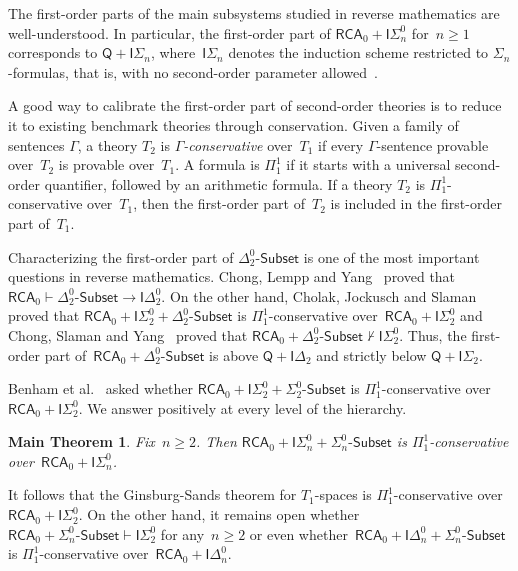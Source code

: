 \documentclass{article}
\newcommand{\ISig}{\mathsf{I}\Sigma^0}
\newcommand{\Robinson}{\mathsf{Q}}
\newcommand{\IDelta}{\mathsf{I}\Delta^0}
\newcommand{\Sub}[1]{{#1}\mbox{-}\mathsf{Subset}}
\newcommand{\RCA}{\mathsf{RCA}}
\numberwithin{theorem}{section}
\newtheorem{maintheorem}[theorem]{Main Theorem}
\theoremstyle{definition}
\begin{document}
The first-order parts of the main subsystems studied in reverse mathematics are well-understood.
In particular, the first-order part of $\RCA_0 + \ISig_n$ for~$n \geq 1$ corresponds to
$\Robinson + \mathsf{I}\Sigma_n$, where~$\mathsf{I}\Sigma_n$ denotes the induction scheme restricted to $\Sigma_n$-formulas, that is, with no second-order parameter allowed~\cite{friedmanSystemsSecondOrder1976}. 

A good way to calibrate the first-order part of second-order theories is to reduce it to existing benchmark theories through conservation. Given a family of sentences $\Gamma$, a theory $T_2$ is \emph{$\Gamma$-conservative} over~$T_1$ if every $\Gamma$-sentence provable over~$T_2$ is provable over~$T_1$. A formula is \emph{$\Pi^1_1$} if it starts with a universal second-order quantifier, followed by an arithmetic formula. If a theory $T_2$ is $\Pi^1_1$-conservative over~$T_1$, then the first-order part of~$T_2$ is included in the first-order part of~$T_1$.

Characterizing the first-order part of $\Sub{\Delta^0_2}$ is one of the most important questions in reverse mathematics. Chong, Lempp and Yang~\cite{chong2010role} proved that  $\RCA_0 \vdash \Sub{\Delta^0_2} \to \IDelta_2$. On the other hand, Cholak, Jockusch and Slaman~\cite{cholak2001strength} proved that $\RCA_0 + \ISig_2 + \Sub{\Delta^0_2}$ is $\Pi^1_1$-conservative over~$\RCA_0 + \ISig_2$ and Chong, Slaman and Yang~\cite{chong2017inductive} proved that $\RCA_0 + \Sub{\Delta^0_2} \nvdash \ISig_2$. Thus, the first-order part of~$\RCA_0 + \Sub{\Delta^0_2}$ is above $\Robinson + \mathsf{I}\Delta_2$ and strictly below $\Robinson + \mathsf{I}\Sigma_2$.

Benham et al.~\cite{benham2024ginsburg} asked whether $\RCA_0 + \ISig_2 + \Sub{\Sigma^0_2}$ is $\Pi^1_1$-conservative over~$\RCA_0 + \ISig_2$. We answer positively at every level of the hierarchy.

\begin{maintheorem}\label{thm:main-conservation}
Fix~$n \geq 2$. Then $\RCA_0 + \ISig_n + \Sub{\Sigma^0_n}$ is $\Pi^1_1$-conservative over~$\RCA_0 + \ISig_n$.
\end{maintheorem}

It follows that the Ginsburg-Sands theorem for $T_1$-spaces is $\Pi^1_1$-conservative over~$\RCA_0 + \ISig_2$.
On the other hand, it remains open whether $\RCA_0 + \Sub{\Sigma^0_n} \vdash \ISig_2$ for any~$n \geq 2$
or even whether~$\RCA_0 + \IDelta_n + \Sub{\Sigma^0_n}$ is $\Pi^1_1$-conservative over~$\RCA_0 + \IDelta_n$.
\end{document}
